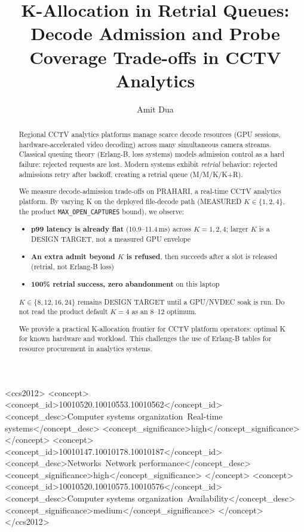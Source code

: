 \documentclass[sigconf,review]{acmart}
\begin{document}
\title{K-Allocation in Retrial Queues: Decode Admission and Probe Coverage Trade-offs in CCTV Analytics}

\author{Amit Dua}

\begin{abstract}
Regional CCTV analytics platforms manage scarce decode resources (GPU sessions, hardware-accelerated video decoding)
across many simultaneous camera streams. Classical queuing theory (Erlang-B, loss systems) models admission control
as a hard failure: rejected requests are lost. Modern systems exhibit \emph{retrial} behavior: rejected admissions
retry after backoff, creating a retrial queue (M/M/K/K+R).

We measure decode-admission trade-offs on PRAHARI, a real-time CCTV analytics platform. By varying K on the deployed file-decode path (MEASURED $K\in\{1,2,4\}$, the product
\texttt{MAX\_OPEN\_CAPTURES} bound), we observe:

\begin{itemize}
  \item \textbf{p99 latency is already flat} (10.9--11.4\,ms) across $K=1,2,4$; larger $K$ is a DESIGN TARGET, not a measured GPU envelope
  \item \textbf{An extra admit beyond $K$ is refused}, then succeeds after a slot is released (retrial, not Erlang-B loss)
  \item \textbf{100\% retrial success, zero abandonment} on this laptop
\end{itemize}
$K\in\{8,12,16,24\}$ remains DESIGN TARGET until a GPU/NVDEC soak is run. Do not read the product default $K=4$ as an 8--12 optimum.

We provide a practical K-allocation frontier for CCTV platform operators: optimal K for known hardware and workload.
This challenges the use of Erlang-B tables for resource procurement in analytics systems.
\end{abstract}

\begin{CCSXML}
<ccs2012>
  <concept>
    <concept_id>10010520.10010553.10010562</concept_id>
    <concept_desc>Computer systems organization~Real-time systems</concept_desc>
    <concept_significance>high</concept_significance>
  </concept>
  <concept>
    <concept_id>10010147.10010178.10010187</concept_id>
    <concept_desc>Networks~Network performance</concept_desc>
    <concept_significance>high</concept_significance>
  </concept>
  <concept>
    <concept_id>10010520.10010575.10010576</concept_id>
    <concept_desc>Computer systems organization~Availability</concept_desc>
    <concept_significance>medium</concept_significance>
  </concept>
</ccs2012>
\end{CCSXML}
\end{document}
